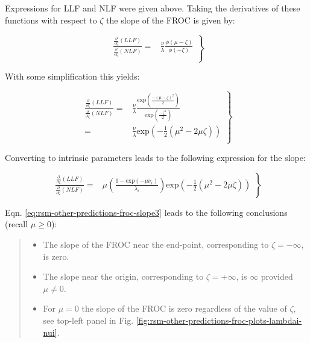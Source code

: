 \documentclass[
]{book}
\providecommand{\tightlist}{%
  \setlength{\itemsep}{0pt}\setlength{\parskip}{0pt}}
\begin{document}
Expressions for LLF and NLF were given above. Taking the derivatives of these functions with respect to \(\zeta\) the slope of the FROC is given by:

\begin{equation}
\left. 
\begin{aligned}
\frac{\frac{\partial }{\partial \zeta}\left( LLF \right)}{\frac{\partial }{\partial \zeta}\left( NLF \right)}  
=& \frac{\nu}{\lambda}  \frac{\phi\left( \mu-\zeta \right)}{\phi\left( -\zeta \right)} \\
\end{aligned}
\right \} 
\label{eq:rsm-other-predictions-froc-slope1}
\end{equation}

With some simplification this yields:

\begin{equation}
\left. 
\begin{aligned}
\frac{\frac{\partial }{\partial \zeta}\left( LLF \right)}{\frac{\partial }{\partial \zeta}\left( NLF \right)}  
=& \frac{\nu}{\lambda}  \frac{\text{exp}\left ( \frac{-\left (\mu-\zeta  \right )^2}{2} \right )}{\text{exp}\left ( \frac{-\zeta^2}{2} \right )} \\
=& \frac{\nu}{\lambda} \text{exp}\left (-\frac{1}{2} \left( \mu^2 - 2\mu\zeta \right)\right ) \\
\end{aligned}
\right \} 
\label{eq:rsm-other-predictions-froc-slope2}
\end{equation}

Converting to intrinsic parameters leads to the following expression for the slope:

\begin{equation}
\left. 
\begin{aligned}
\frac{\frac{\partial }{\partial \zeta}\left( LLF \right)}{\frac{\partial }{\partial \zeta}\left( NLF \right)}  
=& \mu \left( \frac{1 - \text{exp}\left ( - \mu \nu_i \right ) }{\lambda_i} \right) \text{exp}\left (-\frac{1}{2} \left( \mu^2 - 2\mu\zeta \right)  \right )
\end{aligned}
\right \} 
\label{eq:rsm-other-predictions-froc-slope3}
\end{equation}

Eqn. \eqref{eq:rsm-other-predictions-froc-slope3} leads to the following conclusions (recall \(\mu \ge 0\)):

\begin{quote}
\begin{itemize}
\tightlist
\item
  The slope of the FROC near the end-point, corresponding to \(\zeta = -\infty\), is zero.
\item
  The slope near the origin, corresponding to \(\zeta = +\infty\), is \(\infty\) provided \(\mu \ne 0\).
\item
  For \(\mu = 0\) the slope of the FROC is zero regardless of the value of \(\zeta\), see top-left panel in Fig. \ref{fig:rsm-other-predictions-froc-plots-lambdai-nui}.
\end{itemize}
\end{quote}
\end{document}
